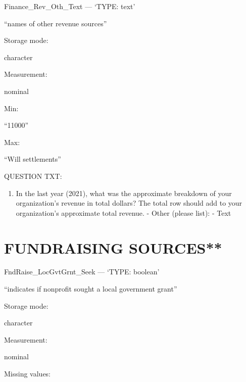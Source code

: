 \documentclass[
  letterpaper,
]{scrbook}
\providecommand{\tightlist}{%
  \setlength{\itemsep}{0pt}\setlength{\parskip}{0pt}}\usepackage{longtable,booktabs,array}
\begin{document}
\begin{enumerate}
\begin{enumerate}
\begin{enumerate}
\begin{enumerate}
\begin{enumerate}
\begin{enumerate}
\begin{enumerate}
\begin{enumerate}
                Finance\_Rev\_Oth\_Text --- {`TYPE: text'}

                ``names of other revenue sources''

                Storage mode:

                character

                Measurement:

                nominal

                Min:

                ``11000''

                Max:

                ``Will settlements''

                QUESTION TXT:

                \begin{enumerate}
                \def\labelenumix{\arabic{enumix}.}
                \tightlist
                \item
                  In the last year (2021), what was the approximate
                  breakdown of your organization's revenue in total
                  dollars? The total row should add to your
                  organization's approximate total revenue. - Other
                  (please list): - Text
                \end{enumerate}
              \end{enumerate}
            \end{enumerate}
          \end{enumerate}
        \end{enumerate}
      \end{enumerate}
    \end{enumerate}
  \end{enumerate}
\end{enumerate}

\chapter{FUNDRAISING SOURCES**}\label{fundraising-sources}

FndRaise\_LocGvtGrnt\_Seek --- {`TYPE: boolean'}

``indicates if nonprofit sought a local government grant''

Storage mode:

character

Measurement:

nominal

Missing values:
\end{document}
